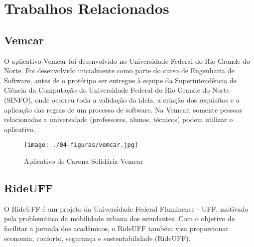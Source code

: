 \chapter{Trabalhos Relacionados}

\section{Vemcar}

O aplicativo Vemcar foi desenvolvido no Universidade Federal do Rio Grande do Norte. Foi desenvolvido inicialmente como parte do curso de Engenharia de Software, antes de o protótipo ser entregue à equipe da Superintendência de Ciência da Computação do Universidade Federal do Rio Grande do Norte (SINFO), onde ocorreu toda a validação da ideia, a criação dos requisitos e a aplicação das regras de um processo de software. Na Vemcar, somente pessoas relacionadas a universidade (professores, alunos, técnicos) podem utilizar o aplicativo.


\begin{figure}[!hbtp]
	\centering
	\caption{Aplicativo de Carona Solidária Vemcar}
	\texttt{[image: ./04-figuras/vemcar.jpg]}
	\label{fig:tecnologia}
\end{figure}

\section{RideUFF}

O RideUFF é um projeto da Universidade Federal Fluminense - UFF, motivado pela problemática da mobilidade urbana dos estudantes. Com o objetivo de facilitar a jornada dos acadêmicos, o RideUFF também visa proporcionar economia, conforto, segurança e sustentabilidade (RideUFF).

